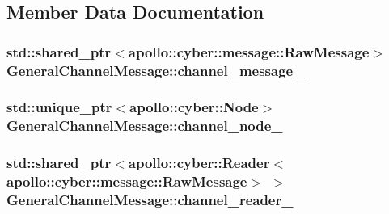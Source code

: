 \subsection{Member Data Documentation}
\hypertarget{classGeneralChannelMessage_a6b288701779537fb1a9846214d9ebeac}{
\subsubsection[{channel\-\_\-message\-\_\-}]{\setlength{\rightskip}{0pt plus 5cm}std\-::shared\-\_\-ptr$<${\bf apollo\-::cyber\-::message\-::\-Raw\-Message}$>$ General\-Channel\-Message\-::channel\-\_\-message\-\_\-\hspace{0.3cm}{\ttfamily [private]}}}\label{classGeneralChannelMessage_a6b288701779537fb1a9846214d9ebeac}
\hypertarget{classGeneralChannelMessage_a9663241eded60406a25281d650713ec5}{
\subsubsection[{channel\-\_\-node\-\_\-}]{\setlength{\rightskip}{0pt plus 5cm}std\-::unique\-\_\-ptr$<${\bf apollo\-::cyber\-::\-Node}$>$ General\-Channel\-Message\-::channel\-\_\-node\-\_\-\hspace{0.3cm}{\ttfamily [private]}}}\label{classGeneralChannelMessage_a9663241eded60406a25281d650713ec5}
\hypertarget{classGeneralChannelMessage_a6fbe63b8ee339b6bbf99736aa6a873cf}{
\subsubsection[{channel\-\_\-reader\-\_\-}]{\setlength{\rightskip}{0pt plus 5cm}std\-::shared\-\_\-ptr$<${\bf apollo\-::cyber\-::\-Reader}$<${\bf apollo\-::cyber\-::message\-::\-Raw\-Message}$>$ $>$ General\-Channel\-Message\-::channel\-\_\-reader\-\_\-\hspace{0.3cm}{\ttfamily [private]}}}\label{classGeneralChannelMessage_a6fbe63b8ee339b6bbf99736aa6a873cf}

